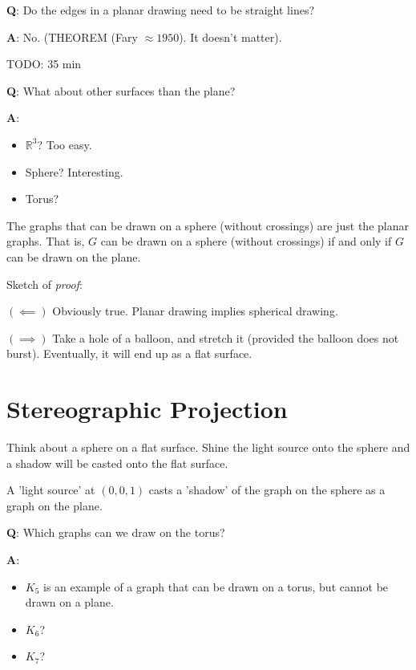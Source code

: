 \textbf{Q}: Do the edges in a planar drawing need to be straight
lines?

\textbf{A}: No. (THEOREM (Fary $ \approx 1950 $). It doesn't matter).

TODO: 35 min

\textbf{Q}: What about other surfaces than the plane?

\textbf{A}:
\begin{itemize}
    \item $ \mathbb{R}^3 $? Too easy.
    \item Sphere? Interesting.
    \item Torus?
\end{itemize}

\begin{thmbox}
    \begin{prop}
        The graphs that can be drawn on a sphere (without crossings)
        are just the planar graphs. That is, $ G $ can be drawn
        on a sphere (without crossings)
        if and only if $ G $ can be drawn on the plane.
    \end{prop}
\end{thmbox}

Sketch of \emph{proof}:

$ (\impliedby) $ Obviously true. Planar drawing implies spherical drawing.

$ (\implies) $ Take a hole of a balloon, and stretch it (provided the balloon
does not burst). Eventually, it will end up as a flat surface.

\section{Stereographic Projection}
Think about a sphere on a flat surface. Shine the light source onto the sphere
and a shadow will be casted onto the flat surface.

A 'light source' at $ (0,0,1) $ casts a 'shadow' of the graph on the sphere as
a graph on the plane.

\textbf{Q}: Which graphs can we draw on the torus?

\textbf{A}:
\begin{itemize}
    \item $ K_5 $ is an example of a graph that can be drawn on
          a torus, but cannot be drawn on a plane.
    \item $ K_6 $?
    \item $ K_7 $?
\end{itemize}
